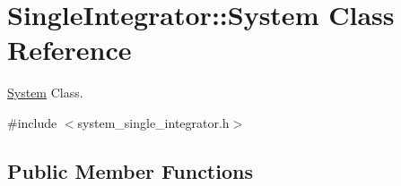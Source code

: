 \hypertarget{class_single_integrator_1_1_system}{\section{Single\-Integrator\-:\-:System Class Reference}
\label{class_single_integrator_1_1_system}
}


\hyperlink{class_single_integrator_1_1_system}{System} Class.  




{\ttfamily \#include $<$system\-\_\-single\-\_\-integrator.\-h$>$}

\subsection*{Public Member Functions}
